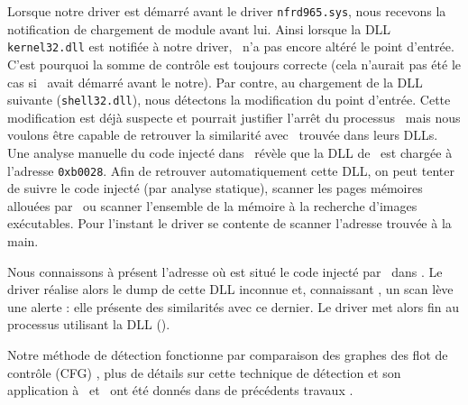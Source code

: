 Lorsque notre driver est démarré avant le driver \texttt{nfrd965.sys}, nous recevons la notification de chargement de module avant lui. Ainsi lorsque la DLL \texttt{kernel32.dll} est notifiée à notre driver, \Duqu\ n'a pas encore altéré le point d'entrée. C'est pourquoi la somme de contrôle est toujours correcte (cela n'aurait pas été le cas si \Duqu\ avait démarré avant le notre). Par contre, au chargement de la DLL suivante (\texttt{shell32.dll}), nous détectons la modification du point d'entrée. Cette modification est déjà suspecte et pourrait justifier l'arrêt du processus \service\ mais nous voulons être capable de retrouver la similarité avec \Stuxnet\ trouvée dans leurs DLLs.
Une analyse manuelle du code injecté dans \service\ révèle que la DLL de \Duqu\ est chargée à l'adresse \texttt{0xb0028}. Afin de retrouver automatiquement cette DLL, on peut tenter de suivre le code injecté (par analyse statique), scanner les pages mémoires allouées par \service\ ou scanner l'ensemble de la mémoire à la recherche d'images exécutables. Pour l'instant le driver se contente de scanner l'adresse trouvée à la main.

Nous connaissons à présent l'adresse où est situé le code injecté par \Duqu\ dans \service.
Le driver réalise alors le dump de cette DLL inconnue et, connaissant \Stuxnet, un scan lève une alerte : elle présente des similarités avec ce dernier. Le driver met alors fin au processus utilisant la DLL (\service).

Notre méthode de détection fonctionne par comparaison des graphes des flot de contrôle (CFG) \cite{AThierry_BKM08}, plus de détails sur cette technique de détection et son application à \Duqu\ et \Stuxnet\ ont été donnés dans de précédents travaux \cite{AThierry_REAT12,AThierry_MAL12}.


